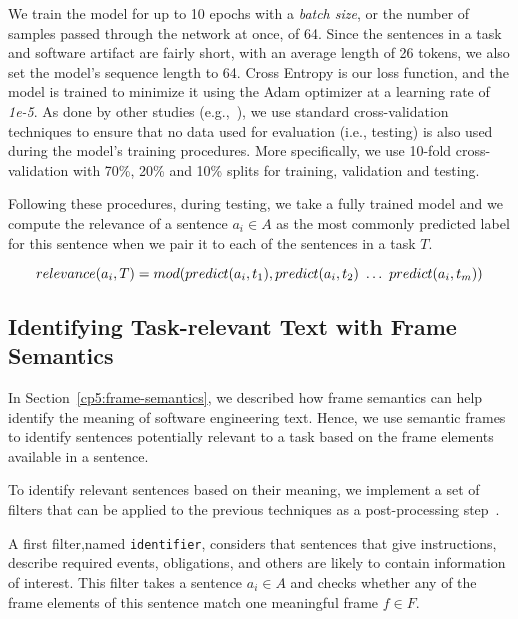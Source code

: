 We train the model for up to 10 epochs with a \textit{batch size}, or the number of samples passed through the network at once, of 64. Since the sentences in a task and software artifact are fairly short, with an average length of 26 tokens, we also set the model's sequence length to 64. Cross Entropy is our loss function, and the model is trained to minimize it using the Adam optimizer at a learning rate of \textit{1e-5}.
As done by other studies (e.g.,~\cite{Chaparro2017, fucci2019, Petrosyan2015}), we use standard cross-validation techniques to ensure  that no data used for evaluation (i.e., testing) is also used
during the model's training procedures. More specifically, we use 10-fold cross-validation with 70\%, 20\% and 10\% splits for training, validation and testing. 




Following these procedures, during testing, we take a fully trained model and we compute the relevance of a sentence $a_i \in A$ as the most commonly predicted label for this sentence when we pair it to each of the sentences in a task $T$.

\begin{equation}
    relevance(a_i, T) = mod(predict(a_i, t_1), predict(a_i, t_2) ~\dots~ predict(a_i, t_m)) \\
\end{equation}





\subsection{Identifying Task-relevant Text with Frame Semantics}






In Section~\ref{cp5:frame-semantics}, we described how frame semantics can help identify the meaning of software engineering text. Hence, we use semantic frames to identify sentences potentially relevant to a task based on the frame elements available in a sentence.



To identify relevant sentences based on their meaning, we implement a set of filters that can be applied to the previous techniques as a post-processing step~\cite{Manning2009IR}.

A first filter,named \texttt{identifier}, considers that sentences that give instructions, describe required events, obligations, and others are likely to contain information of interest. This filter takes a sentence $a_i \in A$ and checks whether any of the frame elements of this sentence match one meaningful frame $f \in F$. 




